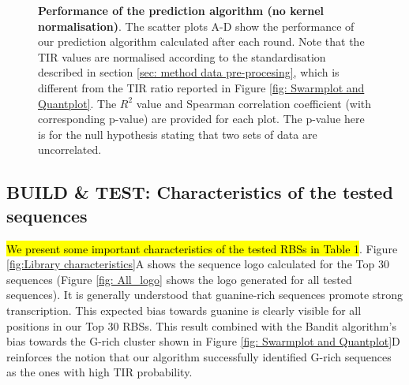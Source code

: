 \documentclass{article}
\begin{document}
\begin{figure}[!ht]
\begin{subfigure}[b]{0.49\textwidth}
    \end{subfigure}
    \caption{\textbf{Performance of the prediction algorithm (no kernel normalisation)}. The scatter plots A-D show the performance of our prediction algorithm calculated after each round.
    Note that the TIR values are normalised according to the standardisation described in section \ref{sec: method data pre-procesing}, which is different from the TIR ratio reported in Figure \ref{fig: Swarmplot and Quantplot}.
    The $R^2$ value and Spearman correlation coefficient (with corresponding p-value) are provided for each plot.
    The p-value here is for the null hypothesis stating that two sets of data are uncorrelated.
    }
    \label{fig: Scatterplot}
\end{figure}

\subsection{BUILD \& TEST: Characteristics of the tested sequences}
\label{sec:characteristics-of-library}


\hl{We present some important characteristics of the tested RBSs in Table 1}.
Figure \ref{fig:Library characteristics}A shows the sequence logo calculated for the Top 30 sequences (Figure \ref{fig: All_logo} shows the logo generated for all tested sequences).
It is generally understood that guanine-rich sequences promote strong transcription.
This expected bias towards guanine is clearly visible for all positions in our Top 30 RBSs.
This result combined with the Bandit algorithm's bias towards the G-rich cluster shown in Figure \ref{fig: Swarmplot and Quantplot}D reinforces the notion that our algorithm successfully identified G-rich sequences as the ones with high TIR probability.\\
\end{document}
